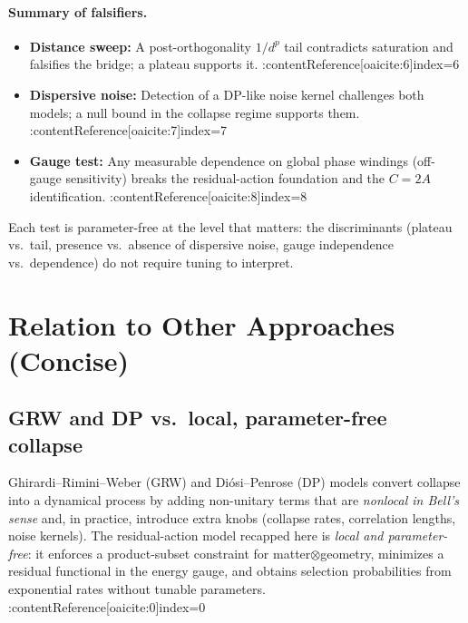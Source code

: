 \documentclass[11pt,letterpaper]{article}
\begin{document}
\paragraph{Summary of falsifiers.}
\begin{itemize}
\item \textbf{Distance sweep:} A post-orthogonality $1/d^p$ tail contradicts saturation and falsifies the bridge; a plateau supports it. :contentReference[oaicite:6]{index=6}
\item \textbf{Dispersive noise:} Detection of a DP-like noise kernel challenges both models; a null bound in the collapse regime supports them. :contentReference[oaicite:7]{index=7}
\item \textbf{Gauge test:} Any measurable dependence on global phase windings (off-gauge sensitivity) breaks the residual-action foundation and the $C=2A$ identification. :contentReference[oaicite:8]{index=8}
\end{itemize}
Each test is parameter-free at the level that matters: the discriminants (plateau vs.\ tail, presence vs.\ absence of dispersive noise, gauge independence vs.\ dependence) do not require tuning to interpret.

\section{Relation to Other Approaches (Concise)}

\subsection*{GRW and DP vs.\ local, parameter-free collapse}

Ghirardi–Rimini–Weber (GRW) and Diósi–Penrose (DP) models convert collapse into a dynamical process by adding non-unitary terms that are \emph{nonlocal in Bell's sense} and, in practice, introduce extra knobs (collapse rates, correlation lengths, noise kernels). The residual-action model recapped here is \emph{local and parameter-free}: it enforces a product-subset constraint for matter$\otimes$geometry, minimizes a residual functional in the energy gauge, and obtains selection probabilities from exponential rates without tunable parameters. :contentReference[oaicite:0]{index=0}
\end{document}
